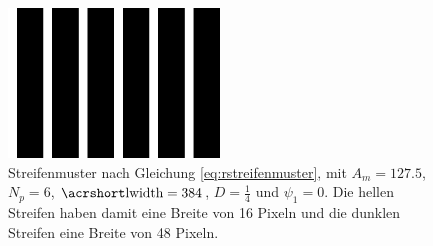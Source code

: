 \begin{figure}[H]
	\centering
	\includegraphics[frame,width=0.5\textwidth]{03_sichtpruefungDurchLichtstreuung/optimierungen/musterMitUnterschiedlichenStreifenbreiten/figures/impulsschwingungStreifenmuster}
	\caption[Rechteckförmiges Streifenmuster]{Streifenmuster nach Gleichung \ref{eq:rstreifenmuster}, mit $A_m = 127.5$, $N_p = 6$, $\acrshortmath{lwidth} = 384$, $D = \tfrac{1}{4}$ und $\psi_1 = 0$. Die hellen Streifen haben damit eine Breite von 16 Pixeln und die dunklen Streifen eine Breite von 48 Pixeln.}
	\label{img:impulsschwingungStreifenmuster}
\end{figure}